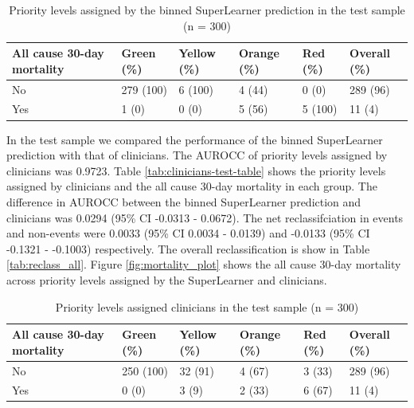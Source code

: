 \documentclass[10pt,letterpaper]{article}\usepackage[]{graphicx}\usepackage[]{color}
\begin{document}
\begin{table}[ht]
\centering
\caption{Priority levels assigned by the binned SuperLearner prediction in the test sample (n = 300)} 
\label{tab:superlearner-priorities-test}
\begin{tabular}{llllll}
  \hline
All cause 30-day mortality & Green (\%) & Yellow (\%) & Orange (\%) & Red (\%) & Overall (\%) \\ 
  \hline
No & 279 (100) & 6 (100) & 4 (44) & 0 (0) & 289 (96) \\ 
  Yes & 1 (0) & 0 (0) & 5 (56) & 5 (100) & 11 (4) \\ 
   \hline
\end{tabular}
\end{table}


In the test sample we compared the performance of the binned SuperLearner
prediction with that of clinicians. The AUROCC of priority levels assigned by
clinicians was 0.9723. Table \ref{tab:clinicians-test-table}
shows the priority levels assigned by clinicians and the all cause 30-day
mortality in each group. The difference in AUROCC between the binned
SuperLearner prediction and clinicians was
0.0294 (95\% CI -0.0313 - 0.0672). The net reclassifciation in events and
non-events were 0.0033 (95\% CI 0.0034 - 0.0139) and -0.0133 (95\% CI -0.1321 - -0.1003) respectively. The overall
reclassification is show in Table \ref{tab:reclass_all}. Figure
\ref{fig:mortality_plot} shows the all cause 30-day mortality across priority
levels assigned by the SuperLearner and clinicians.

\begin{table}[ht]
\centering
\caption{Priority levels assigned clinicians in the test sample (n = 300)} 
\label{tab:clinicians-priorities-test}
\begin{tabular}{llllll}
  \hline
All cause 30-day mortality & Green (\%) & Yellow (\%) & Orange (\%) & Red (\%) & Overall (\%) \\ 
  \hline
No & 250 (100) & 32 (91) & 4 (67) & 3 (33) & 289 (96) \\ 
  Yes & 0 (0) & 3 (9) & 2 (33) & 6 (67) & 11 (4) \\ 
   \hline
\end{tabular}
\end{table}
\end{document}
